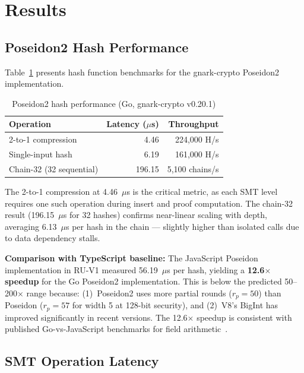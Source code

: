 \section{Results}
\label{sec:results}

\subsection{Poseidon2 Hash Performance}

Table~\ref{tab:hash-perf} presents hash function benchmarks for
the gnark-crypto Poseidon2 implementation.

\begin{table}[h]
\centering
\caption{Poseidon2 hash performance (Go, gnark-crypto v0.20.1)}
\label{tab:hash-perf}
\begin{tabular}{lrr}
\toprule
\textbf{Operation} & \textbf{Latency ($\mu$s)} & \textbf{Throughput} \\
\midrule
2-to-1 compression & 4.46 & 224,000 H/s \\
Single-input hash & 6.19 & 161,000 H/s \\
Chain-32 (32 sequential) & 196.15 & 5,100 chains/s \\
\bottomrule
\end{tabular}
\end{table}

The 2-to-1 compression at 4.46~$\mu$s is the critical metric, as
each SMT level requires one such operation during insert and proof
computation. The chain-32 result (196.15~$\mu$s for 32 hashes)
confirms near-linear scaling with depth, averaging 6.13~$\mu$s per
hash in the chain --- slightly higher than isolated calls due to
data dependency stalls.

\textbf{Comparison with TypeScript baseline:} The JavaScript
Poseidon implementation in RU-V1 measured 56.19~$\mu$s per hash,
yielding a \textbf{12.6$\times$ speedup} for the Go Poseidon2
implementation. This is below the predicted 50--200$\times$ range
because: (1)~Poseidon2 uses more partial rounds ($r_p = 50$) than
Poseidon ($r_p = 57$ for width 5 at 128-bit security), and
(2)~V8's BigInt has improved significantly in recent versions. The
12.6$\times$ speedup is consistent with published Go-vs-JavaScript
benchmarks for field arithmetic~\cite{gnark2024crypto}.

\subsection{SMT Operation Latency}

